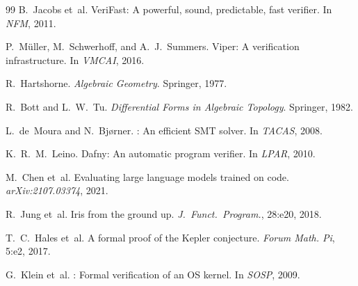 \documentclass[11pt]{article}
\begin{document}
\begin{thebibliography}{99}
B.~Jacobs et~al.
\newblock VeriFast: A powerful, sound, predictable, fast verifier.
\newblock In \emph{NFM}, 2011.

P.~M{\"u}ller, M.~Schwerhoff, and A.~J.~Summers.
\newblock Viper: A verification infrastructure.
\newblock In \emph{VMCAI}, 2016.

R.~Hartshorne.
\newblock \emph{Algebraic Geometry}.
\newblock Springer, 1977.

R.~Bott and L.~W.~Tu.
\newblock \emph{Differential Forms in Algebraic Topology}.
\newblock Springer, 1982.

L.~de~Moura and N.~Bj{\o}rner.
: An efficient {SMT} solver.
\newblock In \emph{TACAS}, 2008.

K.~R.~M.~Leino.
\newblock Dafny: An automatic program verifier.
\newblock In \emph{LPAR}, 2010.

M.~Chen et~al.
\newblock Evaluating large language models trained on code.
\newblock \emph{arXiv:2107.03374}, 2021.

R.~Jung et~al.
\newblock Iris from the ground up.
\newblock \emph{J.~Funct.~Program.}, 28:e20, 2018.

T.~C.~Hales et~al.
\newblock A formal proof of the {K}epler conjecture.
\newblock \emph{Forum Math. Pi}, 5:e2, 2017.

G.~Klein et~al.
: Formal verification of an {OS} kernel.
\newblock In \emph{SOSP}, 2009.

\end{thebibliography}
\end{document}
